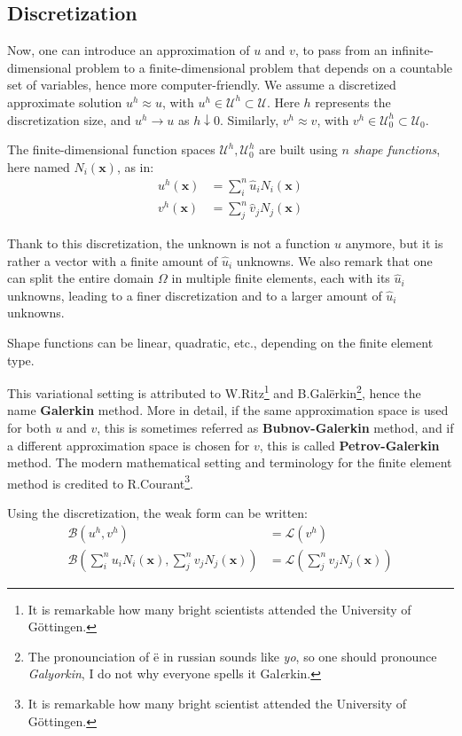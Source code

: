 \documentclass{digitaldynamics}
\def\vect#1{\bm{#1}}
\begin{document}
\subsection{Discretization}

Now, one can introduce an approximation of $u$ and $v$, to pass from an infinite-dimensional problem to a finite-dimensional problem that depends on a countable set of variables, hence more computer-friendly. 
We assume a discretized approximate solution $u^h \approx u$, with $u^h \in \mathcal{U}^h \subset \mathcal{U}$. 
Here $h$ represents the discretization size, and $u^h \rightarrow u$ as $h\downarrow 0$.
Similarly, $v^h \approx v$, with $v^h \in \mathcal{U}_0^h \subset \mathcal{U}_0$. 

The finite-dimensional function spaces $\mathcal{U}^h, \mathcal{U}_0^h$ are built using $n$ \textit{shape functions}, here named $N_i(\vect{x})$, as in:
\begin{align}
u^h(\vect{x}) &= \sum_i^n \hat{u}_i N_i(\vect{x}) \\
v^h(\vect{x}) &= \sum_j^n \hat{v}_j N_j(\vect{x})
\end{align}

Thank to this discretization, the unknown is not a function $u$ anymore, but it is rather a vector with a finite amount of $\hat{u}_i$ unknowns. 
We also remark that one can split the entire domain $\Omega$ in multiple finite elements, each with its $\hat{u}_i$ unknowns, leading to a finer 
discretization and to a larger amount of $\hat{u}_i$ unknowns. 

Shape functions can be linear, quadratic, etc., depending on the finite element type.

This variational setting is attributed to W.Ritz\footnote{It is remarkable how many bright scientists attended the University of Göttingen.}
and B.Gal{\"e}rkin\footnote{The pronounciation of {\"e} in russian sounds like \textit{yo}, so one should pronounce \textit{Galyorkin}, I do not why everyone spells it Gal\textit{e}rkin.}, hence the name \textbf{Galerkin} method. More in detail, if the same approximation space is used for both $u$ and $v$, this is sometimes referred as \textbf{Bubnov-Galerkin} method, and if a different approximation space is chosen for $v$, this is called \textbf{Petrov-Galerkin} method. 
The modern mathematical setting and terminology for the finite element method is credited to R.Courant\footnote{It is remarkable how many bright scientist attended the University of Göttingen.}.

Using the discretization, the weak form can be written:
\begin{align}
\mathcal{B}(u^h,v^h) &= \mathcal{L}(v^h) \\
\mathcal{B}\left(\sum_i^n u_i N_i(\vect{x}),\sum_j^n v_j N_j(\vect{x})\right) &= \mathcal{L}\left(\sum_j^n v_j N_j(\vect{x})\right)
\end{align}
\end{document}
